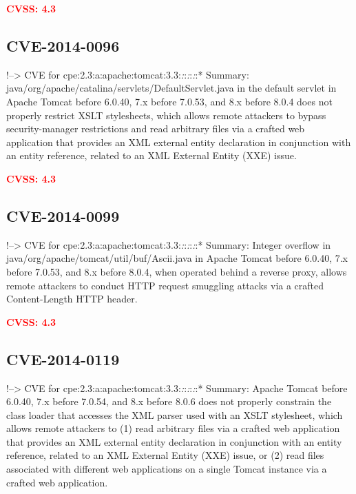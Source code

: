 \documentclass[a4paper, 12pt]{article}
\begin{document}
\textbf{\textcolor{red}{CVSS: 4.3}}

\hypertarget{cve-2014-0096}{%
\subsection{CVE-2014-0096}\label{cve-2014-0096}}

!--\textgreater{} CVE for
cpe:2.3:a:apache:tomcat:3.3:\emph{:}:\emph{:}:\emph{:}:* Summary:
java/org/apache/catalina/servlets/DefaultServlet.java in the default
servlet in Apache Tomcat before 6.0.40, 7.x before 7.0.53, and 8.x
before 8.0.4 does not properly restrict XSLT stylesheets, which allows
remote attackers to bypass security-manager restrictions and read
arbitrary files via a crafted web application that provides an XML
external entity declaration in conjunction with an entity reference,
related to an XML External Entity (XXE) issue.

\textbf{\textcolor{red}{CVSS: 4.3}}

\hypertarget{cve-2014-0099}{%
\subsection{CVE-2014-0099}\label{cve-2014-0099}}

!--\textgreater{} CVE for
cpe:2.3:a:apache:tomcat:3.3:\emph{:}:\emph{:}:\emph{:}:* Summary:
Integer overflow in java/org/apache/tomcat/util/buf/Ascii.java in Apache
Tomcat before 6.0.40, 7.x before 7.0.53, and 8.x before 8.0.4, when
operated behind a reverse proxy, allows remote attackers to conduct HTTP
request smuggling attacks via a crafted Content-Length HTTP header.

\textbf{\textcolor{red}{CVSS: 4.3}}

\hypertarget{cve-2014-0119}{%
\subsection{CVE-2014-0119}\label{cve-2014-0119}}

!--\textgreater{} CVE for
cpe:2.3:a:apache:tomcat:3.3:\emph{:}:\emph{:}:\emph{:}:* Summary: Apache
Tomcat before 6.0.40, 7.x before 7.0.54, and 8.x before 8.0.6 does not
properly constrain the class loader that accesses the XML parser used
with an XSLT stylesheet, which allows remote attackers to (1) read
arbitrary files via a crafted web application that provides an XML
external entity declaration in conjunction with an entity reference,
related to an XML External Entity (XXE) issue, or (2) read files
associated with different web applications on a single Tomcat instance
via a crafted web application.
\end{document}
